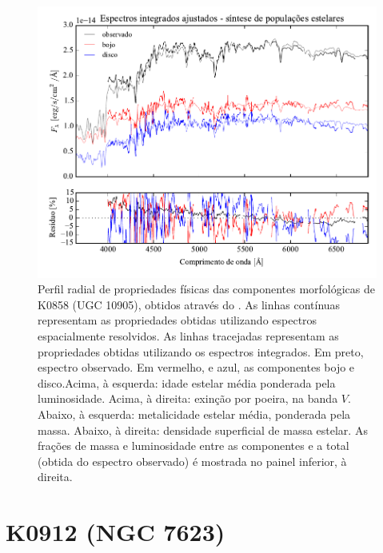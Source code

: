 \begin{figure}
	\includegraphics[page=16]{figuras/sample006a_synthesis}
	\caption[Propriedades físicas das componentes morfológicas de K0858 (UGC 10905)]
	{Perfil radial de propriedades físicas das componentes morfológicas de
	K0858 (UGC 10905), obtidos através do \starlight. As linhas contínuas
	representam as propriedades obtidas utilizando espectros espacialmente
	resolvidos. As linhas tracejadas representam as propriedades obtidas utilizando
	os espectros integrados. Em preto, espectro observado. Em vermelho, e azul, as
	componentes bojo e disco.Acima, à esquerda: idade estelar média ponderada pela
	luminosidade. Acima, à direita: exinção por poeira, na banda $V$. Abaixo, à
	esquerda: metalicidade estelar média, ponderada pela massa. Abaixo, à direita:
	densidade superficial de massa estelar. As frações de massa e luminosidade
	entre as componentes e a total (obtida do espectro observado) é mostrada no
	painel inferior, à direita.}
	\label{fig:decompSinteseRadprof:K0858}
\end{figure}


\section{K0912 (NGC 7623)}
\label{apendice:Decomp:K0912}

